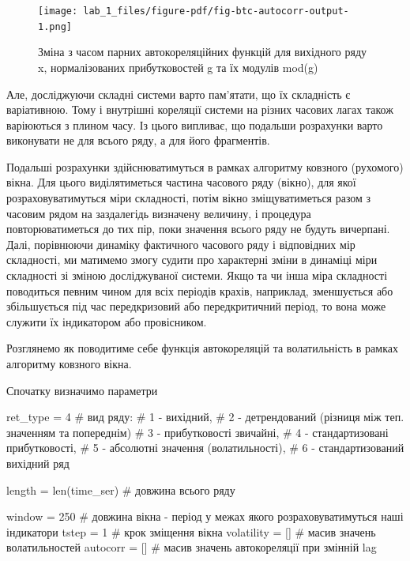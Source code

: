 \documentclass[
  letterpaper,
]{report}
\newenvironment{Shaded}{\begin{snugshade}}{\end{snugshade}}
\newcommand{\BuiltInTok}[1]{\textcolor[rgb]{0.00,0.23,0.31}{#1}}
\newcommand{\CommentTok}[1]{\textcolor[rgb]{0.37,0.37,0.37}{#1}}
\newcommand{\DecValTok}[1]{\textcolor[rgb]{0.68,0.00,0.00}{#1}}
\newcommand{\NormalTok}[1]{\textcolor[rgb]{0.00,0.23,0.31}{#1}}
\newcommand{\OperatorTok}[1]{\textcolor[rgb]{0.37,0.37,0.37}{#1}}
\begin{document}
\begin{figure}[H]

{\centering \texttt{[image: lab\_1\_files/figure-pdf/fig-btc-autocorr-output-1.png]}

}

\caption{\label{fig-btc-autocorr}Зміна з часом парних автокореляційних
функцій для вихідного ряду x, нормалізованих прибутковостей g та їх
модулів mod(g)}

\end{figure}

Але, досліджуючи складні системи варто пам'ятати, що їх складність є
варіативною. Тому і внутрішні кореляції системи на різних часових лагах
також варіюються з плином часу. Із цього випливає, що подальши
розрахунки варто виконувати не для всього ряду, а для його фрагментів.

Подальші розрахунки здійснюватимуться в рамках алгоритму ковзного
(рухомого) вікна. Для цього виділятиметься частина часового ряду
(вікно), для якої розраховуватимуться міри складності, потім вікно
зміщуватиметься разом з часовим рядом на заздалегідь визначену величину,
і процедура повторюватиметься до тих пір, поки значення всього ряду не
будуть вичерпані. Далі, порівнюючи динаміку фактичного часового ряду і
відповідних мір складності, ми матимемо змогу судити про характерні
зміни в динаміці міри складності зі зміною досліджуваної системи. Якщо
та чи інша міра складності поводиться певним чином для всіх періодів
крахів, наприклад, зменшується або збільшується під час передкризовий
або передкритичний період, то вона може служити їх індикатором або
провісником.

Розглянемо як поводитиме себе функція автокореляцій та волатильність в
рамках алгоритму ковзного вікна.

Спочатку визначимо параметри

\begin{Shaded}
\begin{Highlighting}[]
\NormalTok{ret\_type }\OperatorTok{=} \DecValTok{4} \CommentTok{\# вид ряду: }
             \CommentTok{\# 1 {-} вихідний, }
             \CommentTok{\# 2 {-} детрендований (різниця між теп. значенням та попереднім)}
             \CommentTok{\# 3 {-} прибутковості звичайні, }
             \CommentTok{\# 4 {-} стандартизовані прибутковості, }
             \CommentTok{\# 5 {-} абсолютні значення (волатильності),}
             \CommentTok{\# 6 {-} стандартизований вихідний ряд }

\NormalTok{length }\OperatorTok{=} \BuiltInTok{len}\NormalTok{(time\_ser) }\CommentTok{\# довжина всього ряду}

\NormalTok{window }\OperatorTok{=} \DecValTok{250}    \CommentTok{\# довжина вікна {-} період у межах якого розраховуватимуться наші індикатори}
\NormalTok{tstep }\OperatorTok{=} \DecValTok{1}       \CommentTok{\# крок зміщення вікна}
\NormalTok{volatility }\OperatorTok{=}\NormalTok{ [] }\CommentTok{\# масив значень волатильностей }
\NormalTok{autocorr }\OperatorTok{=}\NormalTok{ []   }\CommentTok{\# масив значень автокореляції при змінній lag}
\end{Highlighting}
\end{Shaded}
\end{document}
